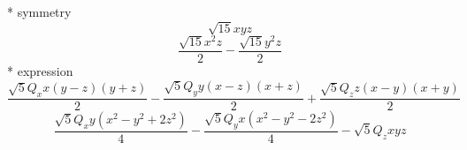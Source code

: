 \documentclass[fleqn,8pt]{jsarticle}
\begin{document}
\noindent\quad ** symmetry
\begin{dmath*}
\sqrt{15} x y z
\end{dmath*}
\begin{dmath*}
\frac{\sqrt{15} x^{2} z}{2} - \frac{\sqrt{15} y^{2} z}{2}
\end{dmath*}
\noindent\quad ** expression
\begin{dmath*}
\frac{\sqrt{5} Q_{x} x \left(y - z\right) \left(y + z\right)}{2} - \frac{\sqrt{5} Q_{y} y \left(x - z\right) \left(x + z\right)}{2} + \frac{\sqrt{5} Q_{z} z \left(x - y\right) \left(x + y\right)}{2}
\end{dmath*}
\begin{dmath*}
\frac{\sqrt{5} Q_{x} y \left(x^{2} - y^{2} + 2 z^{2}\right)}{4} - \frac{\sqrt{5} Q_{y} x \left(x^{2} - y^{2} - 2 z^{2}\right)}{4} - \sqrt{5} Q_{z} x y z
\end{dmath*}
\end{document}
